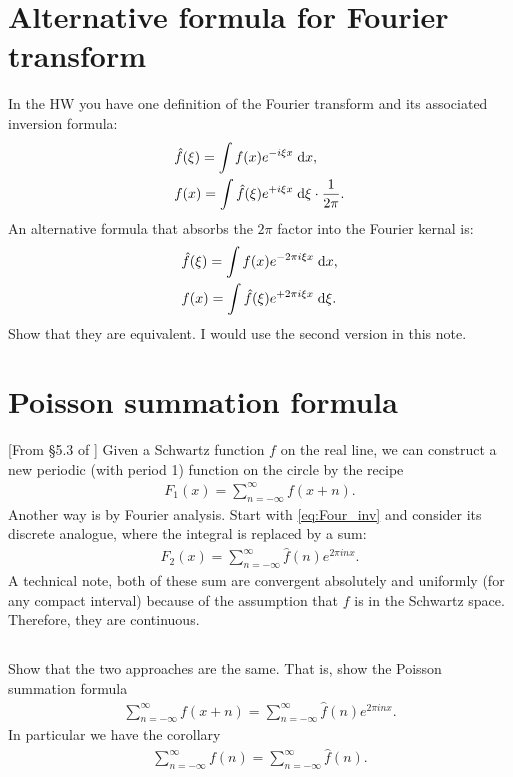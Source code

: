 \documentclass[11pt,letterpaper]{article}
\begin{document}
\section{Alternative formula for Fourier transform}
In the HW you have one definition of the Fourier transform and its associated inversion formula:
\begin{align}
    &\hat f(\xi) = \int f(x)e^{-i\xi x} \;\mathrm{d} x,\\
    &f(x) = \int \hat f(\xi)e^{+i\xi x} \;\mathrm{d} \xi \cdot\frac{1}{2\pi}.
\end{align}
An alternative formula that absorbs the $2\pi$ factor into the Fourier kernal is:
\begin{align}
    &\hat f(\xi ) = \int f(x)e^{-2\pi i\xi x} \;\mathrm{d} x,\\
    &f(x) = \int \hat f(\xi)e^{+2\pi i \xi x} \;\mathrm{d} \xi \label{eq:Four_inv}.
\end{align}
Show that they are equivalent. I would use the second version in this note.

\section{Poisson summation formula}
[From \S5.3 of \cite{SteinShakarchi_03}] Given a Schwartz function $f$ on the real line, we can construct a new periodic (with period 1) function on the circle by the recipe
\begin{align}
    F_1(x) = \sum_{n=-\infty}^\infty f(x+n).
\end{align}
Another way is by Fourier analysis. Start with \eqref{eq:Four_inv} and consider its discrete analogue, where the integral is replaced by a sum:
\begin{align}
    F_2(x) = \sum_{n=-\infty}^\infty \hat f(n)e^{2\pi inx}.
\end{align}
A technical note, both of these sum are convergent absolutely and uniformly (for any compact interval) because of the assumption that $f$ is in the Schwartz space. Therefore, they are continuous. 

\subsection{}
Show that the two approaches are the same. That is, show the Poisson summation formula
\begin{align}
    \sum_{n=-\infty}^\infty f(x+n) = \sum_{n=-\infty}^\infty \hat f(n)e^{2\pi inx}.
\end{align}
In particular we have the corollary
\begin{align}
    \sum_{n=-\infty}^\infty f(n) = \sum_{n=-\infty}^\infty \hat f(n).
\end{align}
\end{document}
